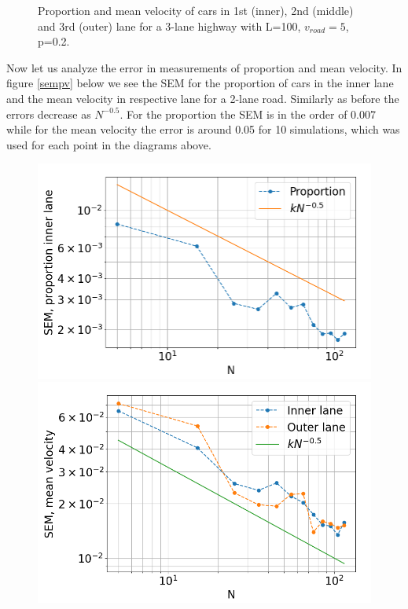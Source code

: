 \documentclass[a4paper,12pt]{article}
\begin{document}
\begin{figure}[H]
\begin{minipage}{.5\textwidth}
    \end{minipage}
    \caption{Proportion and mean velocity of cars in 1st (inner), 2nd (middle) and 3rd (outer) lane for a 3-lane highway with L=100, $v_{road}=5$, p=0.2.}
    \label{41a}
\end{figure}

Now let us analyze the error in measurements of proportion and mean velocity. In figure \ref{sempv} below we see the SEM for the proportion of cars in the inner lane and the mean velocity in respective lane for a 2-lane road. Similarly as before the errors decrease as $N^{-0.5}$. For the proportion the SEM is in the order of 0.007 while for the mean velocity the error is around 0.05 for 10 simulations, which was used for each point in the diagrams above. 
\begin{figure}[H]
	 \centering
    \begin{minipage}{.5\textwidth}
        \centering
        \includegraphics[scale=0.36]{fig11.png}
    \end{minipage}%
    \begin{minipage}{.5\textwidth}
        \centering
        \includegraphics[scale=0.36]{fig12.png}

\end{minipage}
\end{figure}
\end{document}
